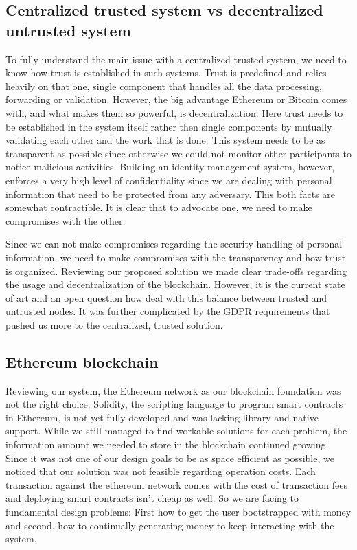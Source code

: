 \subsection{Centralized trusted system vs decentralized untrusted system}
To fully understand the main issue with a centralized trusted system, we need to know how trust is established in such systems. Trust is predefined and relies heavily on that one, single component that handles all the data processing, forwarding or validation. However, the big advantage Ethereum or Bitcoin comes with, and what makes them so powerful, is decentralization.  Here trust needs to be established in the system itself rather then single components by mutually validating each other and the work that is done.  This system needs to be as transparent as possible since otherwise we could not monitor other participants to notice malicious activities. Building an identity management system, however, enforces a very high level of confidentiality since we are dealing with personal information that need to be protected from any adversary. This both facts are somewhat contractible. It is clear that to advocate one, we need to make compromises with the other. 

Since we can not make compromises regarding the security handling of personal information, we need to make compromises with the transparency and how trust is organized. Reviewing our proposed solution we made clear trade-offs regarding the usage and decentralization of the blockchain. However, it is the current state of art and an open question how deal with this balance between trusted and untrusted nodes. It was further complicated by the GDPR requirements that pushed us more to the centralized, trusted solution. 

\subsection{Ethereum blockchain}
Reviewing our system, the Ethereum network as our blockchain foundation was not the right choice. Solidity, the scripting language to program smart contracts in Ethereum, is not yet fully developed and was lacking library and native support. While we still managed to find workable solutions for each problem, the information amount we needed to store in the blockchain continued growing. Since it was not one of our design goals to be as space efficient as possible, we noticed that our solution was not feasible regarding operation costs. Each transaction against the ethereum network comes with the cost of transaction fees and deploying smart contracts isn’t cheap as well. So we are facing to fundamental design problems: First how to get the user bootstrapped with money and second, how to continually generating money to keep interacting with the system.

